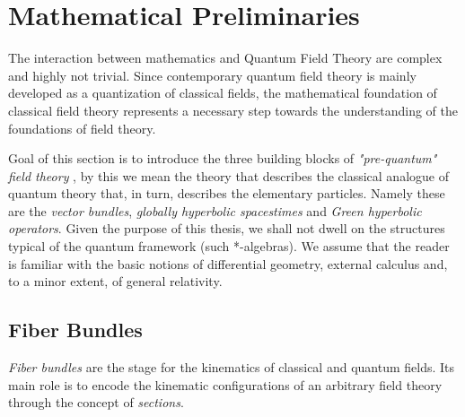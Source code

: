 \documentclass[Main]{subfiles}
\begin{document}
\chapter{Mathematical Preliminaries}
	The interaction between mathematics and Quantum Field Theory are complex and highly not trivial.
	Since contemporary quantum field theory is mainly developed as a quantization of classical fields, the mathematical foundation of classical field theory represents a necessary step towards the understanding of the foundations of field theory.
	
	Goal of this section is to introduce the three  building blocks of \emph{"pre-quantum" field theory} , by this we mean the theory that describes the classical analogue of quantum theory that, in turn, describes the elementary particles.
	Namely these are the \emph{vector bundles}, \emph{globally hyperbolic spacestimes} and \emph{Green hyperbolic operators}.
	Given the purpose of this thesis, we shall not dwell on the structures typical of the quantum framework (such *-algebras).
	We assume that the reader is familiar with the basic notions of differential geometry, external calculus and, to a minor extent, of general relativity.
	\section{Fiber Bundles}
		\emph{Fiber bundles} are the stage for the kinematics of classical and quantum fields.
		Its main role is to encode the kinematic configurations of an arbitrary field theory through the concept of
		\emph{sections}.
		
\end{document}
